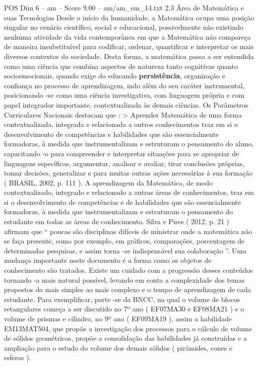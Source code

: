 \begin{textsample}{POS Dim 6 – am – Score 9.00 – am/am\_em\_14.txt}  \label{ex:f6_pos_264}
2.3 Área de Matemática e suas Tecnologias Desde o início da humanidade, a Matemática ocupa uma posição singular no cenário científico, social e educacional, possivelmente não existindo nenhuma atividade da vida contemporânea em que a Matemática não compareça de maneira insubstituível para codificar, ordenar, quantificar e interpretar os mais diversos contextos da sociedade.
Desta forma, a matemática passa a ser entendida como uma ciência que combina aspectos de natureza tanto cognitivas quanto socioemocionais, quando exige do educando \textbf{persistência}, organização e confiança no processo de aprendizagem, indo além do seu caráter instrumental, posicionando -se como uma ciência investigativa, com linguagem própria e com papel integrador importante, contextualizada às demais ciências.
Os Parâmetros Curriculares Nacionais destacam que : > Aprender Matemática de uma forma contextualizada, integrada e relacionada a outros conhecimentos traz em si o desenvolvimento de competências e habilidades que são essencialmente formadoras, à medida que instrumentalizam e estruturam o pensamento do aluno, capacitando -o para compreender e interpretar situações para se apropriar de linguagens específicas, argumentar, analisar e avaliar, tirar conclusões próprias, tomar decisões, generalizar e para muitas outras ações necessárias à sua formação ( BRASIL, 2002, p. 111 ).
A aprendizagem da Matemática, de modo contextualizado, integrado e relacionado a outras áreas de conhecimentos, traz em si o desenvolvimento de competências e de habilidades que são essencialmente formadoras, à medida que instrumentalizam e estruturam o pensamento do estudante em todas as áreas de conhecimento.
Silva e Pires ( 2012, p. 21 ) afirmam que “ poucas são disciplinas difíceis de ministrar onde a matemática não se faça presente, como por exemplo, em gráficos, comparações, porcentagem de determinadas pesquisas, e assim torna -se indispensável sua colaboração ”.
Uma mudança importante neste documento é a forma como os objetos de conhecimento são tratados.
Existe um cuidado com a progressão desses conteúdos tornando -a mais natural possível, levando em conta a complexidade dos temas propostos do mais simples ao mais complexo e o tempo de aprendizagem de cada estudante.
Para exemplificar, parte -se da BNCC, na qual o volume de blocos retangulares começa a ser discutido no 7º ano ( EF07MA30 e EF08MA21 ) e o volume de prismas e cilindro, no 9º ano ( EF09MA19 ), assim a habilidade EM13MAT504, que propõe a investigação dos processos para o cálculo de volume de sólidos geométricos, propõe a consolidação das habilidades já construídas e a ampliação para o estudo do volume dos demais sólidos ( pirâmides, cones e esferas ).

\end{textsample}
